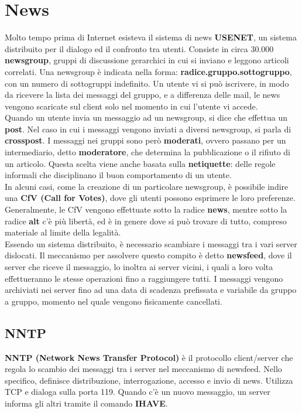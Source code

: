 \section{News}
    Molto tempo prima di Internet esisteva il sistema di news \textbf{USENET}, un sistema distribuito per
    il dialogo ed il confronto tra utenti. Consiste in circa 30.000 \textbf{newsgroup}, gruppi di discussione
    gerarchici in cui si inviano e leggono articoli correlati. Una newsgroup è indicata nella forma:
    \textbf{radice.gruppo.sottogruppo}, con un numero di sottogruppi indefinito. Un utente vi si può
    iscrivere, in modo da ricevere la lista dei messaggi del gruppo, e a differenza delle mail, le news
    vengono scaricate sul client solo nel momento in cui l’utente vi accede.\\

    Quando un utente invia un messaggio ad un newsgroup, si dice che effettua un \textbf{post}. Nel caso
    in cui i messaggi vengono inviati a diversi newsgroup, si parla di \textbf{crosspost}. I messaggi nei
    gruppi sono però \textbf{moderati}, ovvero passano per un intermediario, detto \textbf{moderatore}, che
    determina la pubblicazione o il rifiuto di un articolo. Questa scelta viene anche basata sulla
    \textbf{netiquette}: delle regole informali che disciplinano il buon comportamento di un utente.\\

    In alcuni casi, come la creazione di un particolare newsgroup, è possibile indire una \textbf{CfV (Call
    for Votes)}, dove gli utenti possono esprimere le loro preferenze. Generalmente, le CfV vengono
    effettuate sotto la radice \textbf{news}, mentre sotto la radice \textbf{alt} c’è più libertà, ed è in genere dove si
    può trovare di tutto, compreso materiale al limite della legalità.\\

    Essendo un sistema distribuito, è necessario scambiare i messaggi tra i vari server dislocati. Il
    meccanismo per assolvere questo compito è detto \textbf{newsfeed}, dove il server che riceve il
    messaggio, lo inoltra ai server vicini, i quali a loro volta effettueranno le stesse operazioni fino
    a raggiungere tutti. I messaggi vengono archiviati nei server fino ad una data di scadenza
    prefissata e variabile da gruppo a gruppo, momento nel quale vengono fisicamente cancellati.

    \subsection{NNTP}
        \textbf{NNTP (Network News Transfer Protocol)} è il protocollo client/server che regola lo scambio
        dei messaggi tra i server nel meccanismo di newsfeed. Nello specifico, definisce distribuzione,
        interrogazione, accesso e invio di news. Utilizza TCP e dialoga sulla porta 119.
        Quando c’è un nuovo messaggio, un server informa gli altri tramite il comando \textbf{IHAVE}.